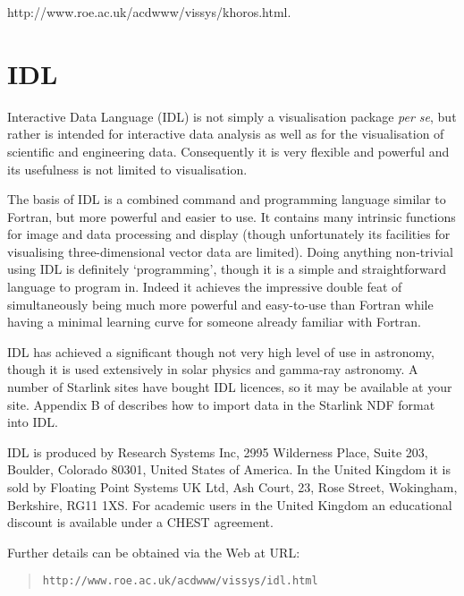 \begin{htmlonly}
{http://www.roe.ac.uk/acdwww/vissys/khoros.html}.
\end{htmlonly}


\section{IDL \label{IDL}  }

Interactive Data Language (IDL) is not simply a visualisation package
{\it per se}, but rather is intended for interactive data analysis as 
well as for the visualisation of scientific and engineering data. 
Consequently it is very flexible and powerful and its usefulness is not
limited to visualisation.

The basis of IDL is a combined command and programming language similar
to Fortran, but more powerful and easier to use. It contains many
intrinsic functions for image and data processing and display (though 
unfortunately its facilities for visualising three-dimensional vector 
data are limited). Doing anything non-trivial using IDL is definitely 
`programming', though it is a simple and straightforward language to 
program in. Indeed it achieves the impressive double feat of
simultaneously being much more powerful and easy-to-use than Fortran 
while having a minimal learning curve for someone already familiar with 
Fortran.

IDL has achieved a significant though not very high level of use in
astronomy, though it is used extensively in solar physics and gamma-ray
astronomy. A number of Starlink sites have bought IDL licences, so it
may be available at your site.  Appendix B of 
\cite{SUN55} describes how to import data in the
Starlink NDF format into IDL.

IDL is produced by Research Systems Inc, 2995 Wilderness Place, Suite
203, Boulder, Colorado 80301, United States of America.  In the United
Kingdom it is sold by Floating Point Systems UK Ltd, Ash Court, 23, Rose
Street, Wokingham, Berkshire, RG11 1XS. For academic users in the
United Kingdom an educational discount is available under a CHEST
agreement.

\begin{latex}
Further details can be obtained via the Web at URL:

\begin{quote}
{\tt http://www.roe.ac.uk/acdwww/vissys/idl.html}
\end{quote}
\end{latex}

